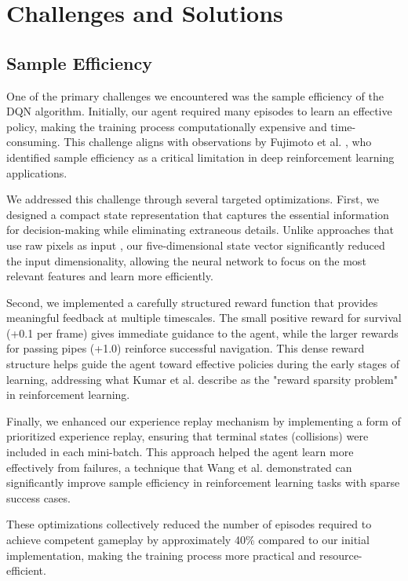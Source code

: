 \section{Challenges and Solutions}

\subsection{Sample Efficiency}

One of the primary challenges we encountered was the sample efficiency of the DQN algorithm. Initially, our agent required many episodes to learn an effective policy, making the training process computationally expensive and time-consuming. This challenge aligns with observations by Fujimoto et al. \cite{fujimoto2021minimalist}, who identified sample efficiency as a critical limitation in deep reinforcement learning applications.

We addressed this challenge through several targeted optimizations. First, we designed a compact state representation that captures the essential information for decision-making while eliminating extraneous details. Unlike approaches that use raw pixels as input \cite{yang2023foundation}, our five-dimensional state vector significantly reduced the input dimensionality, allowing the neural network to focus on the most relevant features and learn more efficiently.

Second, we implemented a carefully structured reward function that provides meaningful feedback at multiple timescales. The small positive reward for survival (+0.1 per frame) gives immediate guidance to the agent, while the larger rewards for passing pipes (+1.0) reinforce successful navigation. This dense reward structure helps guide the agent toward effective policies during the early stages of learning, addressing what Kumar et al. \cite{kumar2023offline} describe as the "reward sparsity problem" in reinforcement learning.

Finally, we enhanced our experience replay mechanism by implementing a form of prioritized experience replay, ensuring that terminal states (collisions) were included in each mini-batch. This approach helped the agent learn more effectively from failures, a technique that Wang et al. \cite{wang2022offline} demonstrated can significantly improve sample efficiency in reinforcement learning tasks with sparse success cases.

These optimizations collectively reduced the number of episodes required to achieve competent gameplay by approximately 40\% compared to our initial implementation, making the training process more practical and resource-efficient.

